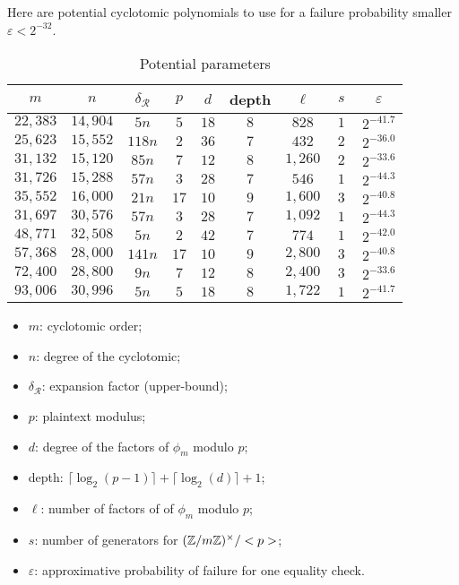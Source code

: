 Here are potential cyclotomic polynomials to use for a failure probability smaller $\varepsilon < 2^{-32}$.

\begin{table}
  \setlength{\tabcolsep}{1em}
  \centering
  \begin{tabular}{||ccc||cccccc||}
    \hline
    $~m~$ & $~n~$ & $~\delta_\mathcal{R}~$ & $~p~$ & $~d~$ & depth & $~\ell~$ & $~s~$ & $~\varepsilon~$ \\
    \hline
    $22,383$ & $14,904$ & $5n$ & $5$  & $18$ & $8$ & $828$  & $1$ &  $2^{-41.7}$ \\
    $25,623$ & $15,552$ & $118n$ & $2$ & $36$ & $7$ & $432$ & $2$ & $2^{-36.0}$ \\
    $31,132$ & $15,120$ & $85n$ & $7$ & $12$ & $8$ & $1,260$ & $2$ & $2^{-33.6}$ \\
    $31,726$ & $15,288$ & $57n$ & $3$ & $28$ & $7$ & $546$ & $1$ & $2^{-44.3}$ \\
    $35,552$ & $16,000$ & $21n$ & $17$ & $10$ & $9$ & $1,600$ & $3$ & $2^{-40.8}$ \\
    \hline
    $31,697$ & $30,576$ & $57n$ & $3$ & $28$ & $7$ & $1,092$ & $1$ & $2^{-44.3}$ \\
    $48,771$ & $32,508$ & $5n$ & $2$ & $42$ & $7$ & $774$ & $1$ & $2^{-42.0}$ \\
    $57,368$ & $28,000$ & $141n$ & $17$ & $10$ & $9$ & $2,800$ & $3$ & $2^{-40.8}$ \\
    $72,400$ & $28,800$ & $9n$ & $7$ & $12$ & $8$ & $2,400$ & $3$ & $2^{-33.6}$ \\
    $93,006$ & $30,996$ & $5n$ & $5$ & $18$ & $8$ & $1,722$ & $1$ & $2^{-41.7}$ \\
    \hline
                                                   
  \end{tabular}
  \caption{Potential parameters}
  \label{tab:params}
\end{table}

\begin{itemize}
\item $m$: cyclotomic order;
\item $n$: degree of the cyclotomic;
\item $\delta_\mathcal{R}$: expansion factor (upper-bound);
\item $p$: plaintext modulus;
\item $d$: degree of the factors of $\phi_m$ modulo $p$;
\item depth: $\lceil \log_2(p-1) \rceil + \lceil \log_2(d)\rceil + 1$;
\item $\ell$: number of factors of of $\phi_m$ modulo $p$;
\item $s$: number of generators for $(\mathbb{Z}/m\mathbb{Z})^\times/<p>$;
\item $\varepsilon$: approximative probability of failure for one equality check.
\end{itemize}

